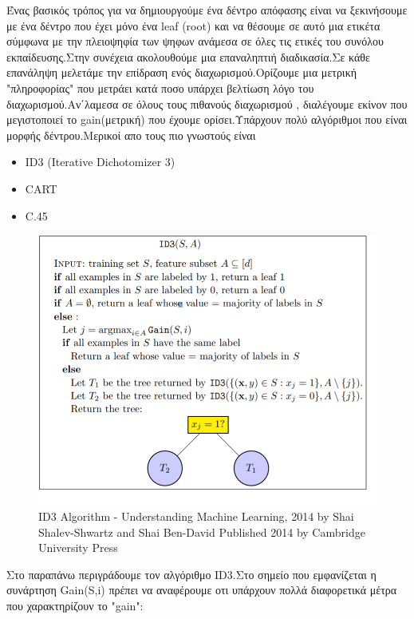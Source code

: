 \documentclass[12pt,a4paper]{article}
\begin{document}
Ένας βασικός τρόπος για να δημιουργούμε ένα δέντρο απόφασης είναι να ξεκινήσουμε με ένα δέντρο που έχει μόνο ένα leaf (root) και να θέσουμε σε αυτό μια ετικέτα σύμφωνα με την πλειοψηφία  των ψηφων ανάμεσα σε όλες τις ετικές του συνόλου εκπαίδευσης.Στην συνέχεια ακολουθούμε μια επαναληπτιή διαδικασία.Σε κάθε επανάληψη μελετάμε την επίδραση ενός διαχωρισμού.Ορίζουμε μια μετρική "πληροφορίας" που μετράει κατά ποσο υπάρχει βελτίωση λόγο του διαχωρισμού.Αν΄λαμεσα σε όλους τους πιθανούς διαχωρισμού , διαλέγουμε εκίνον που μεγιστοποιεί το gain(μετρική) που έχουμε ορίσει.Υπάρχουν πολύ αλγόριθμοι που είναι μορφής δέντρου.Μερικοί απο τους πιο γνωστούς είναι
\begin{itemize}
\item ID3 (Iterative Dichotomizer 3)
\item CART
\item C.45
\end{itemize}


\begin{figure}[H]
\centering
\includegraphics[width=0.40\linewidth,height=0.30\textheight]{Images/plot22}
\caption{ ID3 Algorithm - Understanding Machine Learning,
 2014 by Shai Shalev-Shwartz and Shai Ben-David
Published 2014 by Cambridge University Press}
\label{fig:multi}
\end{figure}

Στο παραπάνω περιγράδουμε τον αλγόριθμο ID3.Στο σημείο που εμφανίζεται η συνάρτηση Gain(S,i) πρέπει να αναφέρουμε οτι υπάρχουν πολλά διαφορετικά μέτρα που χαρακτηρίζουν το "gain":
\end{document}
